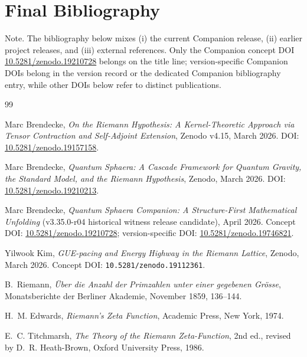 \section*{Final Bibliography}

\noindent Note. The bibliography below mixes (i) the current Companion release, (ii) earlier project releases, and (iii) external references. Only the Companion concept DOI \href{https://doi.org/10.5281/zenodo.19210728}{10.5281/zenodo.19210728} belongs on the title line; version-specific Companion DOIs belong in the version record or the dedicated Companion bibliography entry, while other DOIs below refer to distinct publications.


\begin{thebibliography}{99}

Marc Brendecke,
\emph{On the Riemann Hypothesis: A Kernel-Theoretic Approach via Tensor Contraction and Self-Adjoint Extension},
Zenodo v4.15, March 2026.
\newblock DOI: \href{https://doi.org/10.5281/zenodo.19157158}{10.5281/zenodo.19157158}.

Marc Brendecke,
\emph{Quantum Sphaera: A Cascade Framework for Quantum Gravity, the Standard Model, and the Riemann Hypothesis},
Zenodo, March 2026.
\newblock DOI: \href{https://doi.org/10.5281/zenodo.19210213}{10.5281/zenodo.19210213}.

Marc Brendecke,
\emph{Quantum Sphaera Companion: A Structure-First Mathematical Unfolding} (v3.35.0-r04 historical witness release candidate),
April 2026.
\newblock Concept DOI: \href{https://doi.org/10.5281/zenodo.19210728}{10.5281/zenodo.19210728}; version-specific DOI: \href{https://doi.org/10.5281/zenodo.19746821}{10.5281/zenodo.19746821}.

Yilwook Kim,
\emph{GUE-pacing and Energy Highway in the Riemann Lattice},
Zenodo, March 2026.
\newblock Concept DOI: \texttt{10.5281/zenodo.19112361}.

B.~Riemann,
\emph{\"Uber die Anzahl der Primzahlen unter einer gegebenen Gr\"osse},
Monatsberichte der Berliner Akademie, November 1859, 136--144.

H.~M. Edwards,
\emph{Riemann's Zeta Function},
Academic Press, New York, 1974.

E.~C. Titchmarsh,
\emph{The Theory of the Riemann Zeta-Function},
2nd ed., revised by D.~R. Heath-Brown,
Oxford University Press, 1986.


\end{thebibliography}
